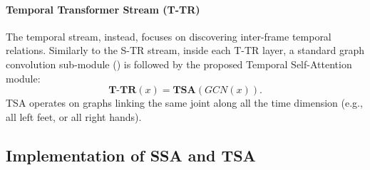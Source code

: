 \documentclass[times,twocolumn,final,authoryear]{elsarticle}
\begin{document}
\paragraph*{\textbf{Temporal Transformer Stream (T-TR)}} 
The temporal stream, instead, focuses on discovering inter-frame temporal relations. Similarly to the S-TR stream, inside each T-TR layer, a standard graph convolution sub-module (\cite{yan2018spatial}) is followed by the proposed Temporal Self-Attention module:
\begin{equation}
    {\textbf{T-TR}}(x)= \textbf{TSA}(GCN(x)) .
\end{equation}
TSA operates on graphs linking the same joint along all the time dimension (e.g., all left feet, or all right hands).
















\subsection{Implementation of SSA and TSA} \label{sec:implementation}
\end{document}
